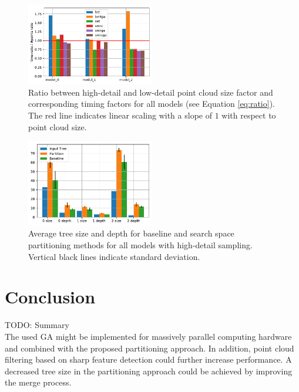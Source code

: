 \begin{figure}[htb]
	\centering
	\includegraphics[width=0.5\textwidth]{figures/g3.pdf}
	\caption{Ratio between high-detail and low-detail point cloud size factor and corresponding timing factors for all models (see Equation \ref{eq:ratio}). The red line indicates linear scaling with a slope of $1$ with respect to point cloud size.}
	\label{fig:graph3}
\end{figure}

\begin{figure}[htb]
	\centering
	\includegraphics[width=0.5\textwidth]{figures/g2.pdf}
	\caption{Average tree size and depth for baseline and search space partitioning methods for all models with high-detail sampling. Vertical black lines indicate standard deviation.}
	\label{fig:graph2}
\end{figure}

\section{Conclusion}
TODO: Summary
\\
The used \ac{GA} might be implemented for massively parallel computing hardware and combined with the proposed partitioning approach. 
In addition, point cloud filtering based on sharp feature detection \cite{weber2010sharp} could further increase performance.
A decreased tree size in the partitioning approach could be achieved by improving the merge process.
